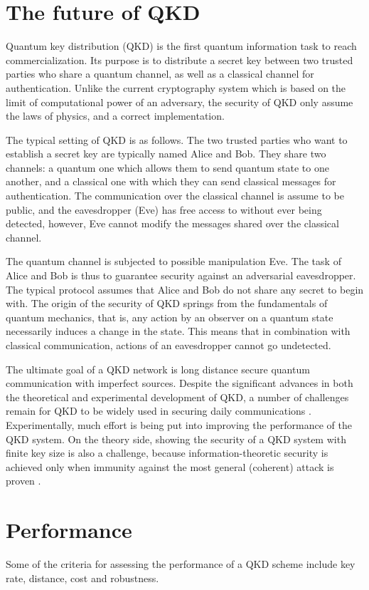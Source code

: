 \section{The future of QKD}
% 
Quantum key distribution (QKD) is the first quantum information task
to reach commercialization. Its purpose is to distribute a secret
key between two trusted parties who share a quantum channel,
as well as a classical channel for authentication. Unlike the current
cryptography system which is based on the limit of computational power of an adversary, the security of QKD only assume the laws of physics, and a 
correct implementation.


The typical setting of QKD is as follows. The two trusted parties who
want to establish a secret key are typically named Alice and Bob.
They share two channels: a quantum one which allows them to send
quantum state to one another, and a classical one with which they can
send classical messages for authentication. The communication over the classical channel is
assume to be public, and the eavesdropper (Eve) has free access to without 
ever being detected, however, Eve cannot modify the messages shared over
the classical channel.

 The quantum channel is subjected to possible manipulation Eve.
  The task of Alice and Bob is thus to guarantee security
against an adversarial eavesdropper. The typical protocol assumes that
Alice and Bob do not share any secret to begin with.
The origin of the security of QKD springs from the fundamentals
of quantum mechanics, that is, any action by an observer on
a quantum state necessarily induces a change in the state. This means
that in combination with classical communication, actions of an eavesdropper cannot go undetected.


The ultimate goal of a QKD network is long distance secure quantum communication with imperfect sources.
% 
Despite the significant advances in both the theoretical and experimental development of QKD, a number of challenges remain for QKD to be widely used 
in securing daily communications \cite{RevModPhys.81.1301,diamanti2016practical}. Experimentally, much effort is being put into improving the performance of the QKD system. On the theory side, 
showing the security of a QKD system with finite key size is also a challenge,  
because information-theoretic security is achieved only when immunity against the most general (coherent) attack is proven \cite{diamanti2016practical}.

\section{Performance}
Some of the criteria for assessing the performance of a QKD scheme include key rate, distance, cost and robustness.
% 
